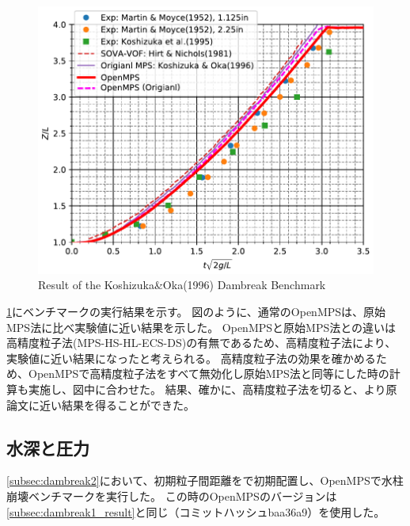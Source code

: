 \begin{figure}
\begin{minipage}{\linewidth}
				\includegraphics[clip, width=\linewidth]{img/koshizuka_oka_1996.pdf}
			\end{minipage}
			\caption{Result of the Koshizuka\&Oka(1996) Dambreak Benchmark \label{fig:result_dambreak1}}
		\end{figure}
		\cref{fig:result_dambreak1}にベンチマークの実行結果を示す。
		図のように、通常のOpenMPSは、原始MPS法に比べ実験値に近い結果を示した。
		OpenMPSと原始MPS法との違いは高精度粒子法(MPS-HS-HL-ECS-DS)の有無であるため、高精度粒子法により、実験値に近い結果になったと考えられる。
		高精度粒子法の効果を確かめるため、OpenMPSで高精度粒子法をすべて無効化し原始MPS法と同等にした時の計算も実施し、図中に合わせた。
		結果、確かに、高精度粒子法を切ると、より原論文に近い結果を得ることができた。

	\subsection{水深と圧力 \label{subsec:spp}}
		\cref{subsec:dambreak2}において、初期粒子間距離をで初期配置し、OpenMPSで水柱崩壊ベンチマークを実行した。
		この時のOpenMPSのバージョンは\cref{subsec:dambreak1_result}と同じ（コミットハッシュbaa36a9）を使用した。

